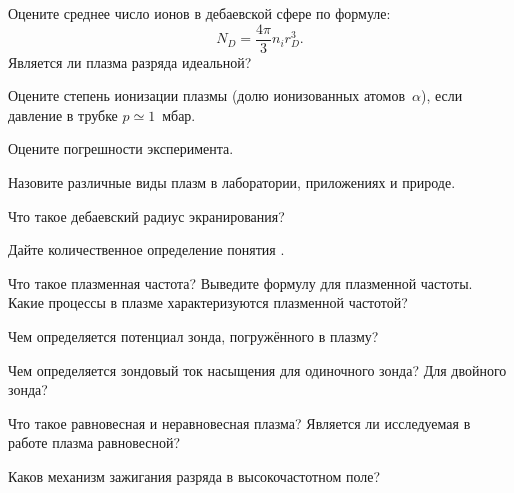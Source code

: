 \begin{lab:task}

\item Оцените среднее число ионов в дебаевской сфере по формуле:
\begin{equation*}
    N_{D}=\frac{4\pi}{3} n_{i}r_{D}^{3}.
\end{equation*}
Является ли плазма разряда идеальной?


\item Оцените степень ионизации плазмы
(долю ионизованных атомов~$\alpha$), если давление в трубке $p \simeq1$~мбар.

\item Оцените погрешности эксперимента.

\end{lab:task}

\begin{lab:questions}
    \item Назовите различные виды плазм в лаборатории, приложениях и природе.
    
    \item Что такое дебаевский радиус экранирования?
    
    \item Дайте количественное определение понятия .
    
    \item Что такое плазменная частота? Выведите формулу для плазменной частоты.
    Какие процессы в плазме характеризуются плазменной частотой?
    
    \item Чем определяется потенциал зонда, погружённого в плазму?
    
    \item Чем определяется зондовый ток насыщения для одиночного зонда? Для двойного
    зонда?
    
    \item Что такое равновесная и неравновесная плазма? 
    Является ли исследуемая в работе плазма равновесной?
        
    \item Каков механизм зажигания разряда в высокочастотном поле?
\end{lab:questions}



